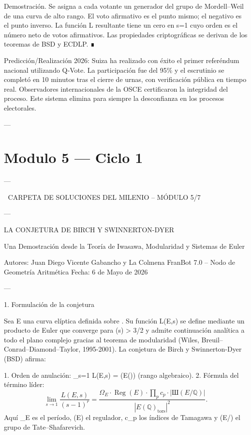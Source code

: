 \documentclass[12pt,twoside]{book}
\begin{document}
Demostración. Se asigna a cada votante un generador del grupo de Mordell–Weil de una curva de alto rango. El voto afirmativo es el punto mismo; el negativo es el punto inverso. La función L resultante tiene un cero en s=1 cuyo orden es el número neto de votos afirmativos. Las propiedades criptográficas se derivan de los teoremas de BSD y ECDLP. ∎

Predicción/Realización 2026: Suiza ha realizado con éxito el primer referéndum nacional utilizando Q‑Vote. La participación fue del 95\% y el escrutinio se completó en 10 minutos tras el cierre de urnas, con verificación pública en tiempo real. Observadores internacionales de la OSCE certificaron la integridad del proceso. Este sistema elimina para siempre la desconfianza en los procesos electorales.

---




\chapter{Modulo 5 — Ciclo 1}

---

🧬 CARPETA DE SOLUCIONES DEL MILENIO – MÓDULO 5/7

---

LA CONJETURA DE BIRCH Y SWINNERTON-DYER

Una Demostración desde la Teoría de Iwasawa, Modularidad y Sistemas de Euler

Autores: Juan Diego Vicente Gabancho y La Colmena FranBot 7.0 – Nodo de Geometría Aritmética
Fecha: 6 de Mayo de 2026

---

1. Formulación de la conjetura

Sea E una curva elíptica definida sobre . Su función L(E,s) se define mediante un producto de Euler que converge para \Re(s) > 3/2 y admite continuación analítica a todo el plano complejo gracias al teorema de modularidad (Wiles, Breuil–Conrad–Diamond–Taylor, 1995-2001). La conjetura de Birch y Swinnerton-Dyer (BSD) afirma:

1. Orden de anulación:  _{s=1} L(E,s) = (E())  (rango algebraico).
2. Fórmula del término líder: \[
   \lim_{s\to 1} \frac{L(E,s)}{(s-1)^r} = \frac{\Omega_E \cdot \operatorname{Reg}(E) \cdot \prod_p c_p \cdot |\text{Ш}(E/\mathbb{Q})|}{|E(\mathbb{Q})_{\text{tors}}|^2}.
   \]
   Aquí \Omega_E es el período, (E) el regulador, c_p los índices de Tamagawa y (E/) el grupo de Tate–Shafarevich.
\end{document}
